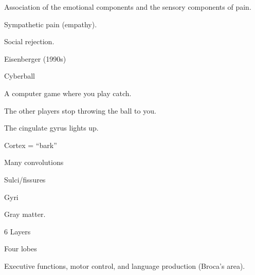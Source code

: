 \begin{coloredlist}
\begin{coloredlist}
\begin{coloredlist}
\begin{coloredlist}
                \item Association of the emotional components and the sensory components of pain.
                \item Sympathetic pain (empathy).
                \item Social rejection.
                \begin{coloredlist}
                    \item Eisenberger (1990s)
                    \item Cyberball
                    \begin{coloredlist}
                        \item A computer game where you play catch.
                        \item The other players stop throwing the ball to you.
                        \item The cingulate gyrus lights up.
                    \end{coloredlist}
                \end{coloredlist}
            \end{coloredlist}
        \end{coloredlist}
        \item {}
        \item {}
        \item {}
    \end{coloredlist}
    \item {}
    \begin{coloredlist}
        \item Cortex = ``bark''
        \item Many convolutions
        \begin{coloredlist}
            \item Sulci/fissures
            \item Gyri
        \end{coloredlist}
        \item Gray matter.
        \item 6 Layers
        \item Four lobes
        \begin{coloredlist}
            \item {}
            \begin{coloredlist}
                \item Executive functions, motor control, and language production (Broca's area).

\end{coloredlist}
\end{coloredlist}
\end{coloredlist}
\end{coloredlist}
